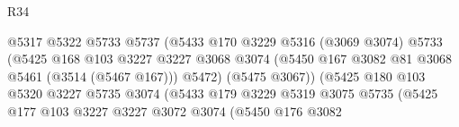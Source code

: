 \begin{lexlean}{R34}
\begin{coremodule}
                                            @5317
                                            @5322
                                            @5733
                                            @5737
                                            (@5433
                                              @170
                                              @3229
                                              @5316
                                              (@3069 @3074)
                                              @5733
                                              (@5425
                                                @168
                                                @103
                                                @3227
                                                @3227
                                                @3068
                                                @3074
                                                (@5450
                                                  @167
                                                  @3082
                                                  @81
                                                  @3068
                                                  @5461
                                                  (@3514 (@5467 @167)))
                                                @5472)
                                              (@5475 @3067))
                                            (@5425
                                              @180
                                              @103
                                              @5320
                                              @3227
                                              @5735
                                              @3074
                                              (@5433
                                                @179
                                                @3229
                                                @5319
                                                @3075
                                                @5735
                                                (@5425
                                                  @177
                                                  @103
                                                  @3227
                                                  @3227
                                                  @3072
                                                  @3074
                                                  (@5450
                                                    @176
                                                    @3082

\end{coremodule}
\end{lexlean}
